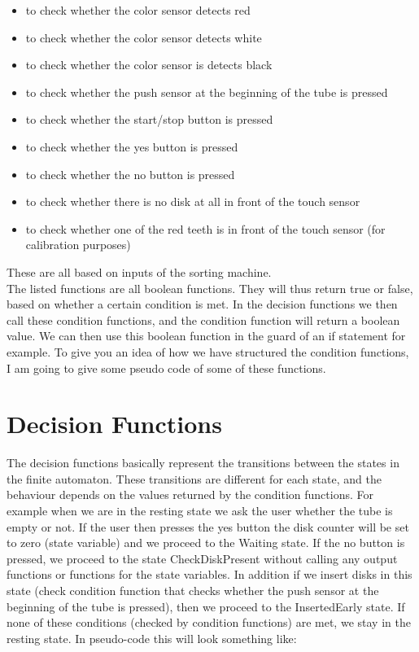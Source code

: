 \begin{itemize}
\item to check whether the color sensor detects red
\item to check whether the color sensor detects white 
\item to check whether the color sensor is detects black
\item to check whether the push sensor at the beginning of the tube is pressed
\item to check whether the start/stop button is pressed
\item to check whether the yes button is pressed
\item to check whether the no button is pressed
\item to check whether there is no disk at all in front of the touch sensor
\item to check whether one of the red teeth is in front of the touch sensor (for calibration purposes) 
\end{itemize}
These are all based on inputs of the sorting machine. \\

The listed functions are all boolean functions. They will thus return true or false, based on whether a certain condition is met. In the decision functions we then call these condition functions, and the condition function will return a boolean value. We can then use this boolean function in the guard of an if statement for example. To give you an idea of how we have structured the condition functions, I am going to give some pseudo code of some of these functions.



\section{Decision Functions}
The decision functions basically represent the transitions between the states in the finite automaton. These transitions are different for each state, and the behaviour depends on the values returned by the condition functions. For example when we are in the resting state we ask the user whether the tube is empty or not. If the user then presses the yes button the disk counter will be set to zero (state variable) and we proceed to the Waiting state. If the no button is pressed, we proceed to the state CheckDiskPresent without calling any output functions or functions for the state variables. In addition if we insert disks in this state (check condition function that checks whether the push sensor at the beginning of the tube is pressed), then we proceed to the InsertedEarly state. If none of these conditions (checked by condition functions) are met, we stay in the resting state. In pseudo-code this will look something like: \newpage

